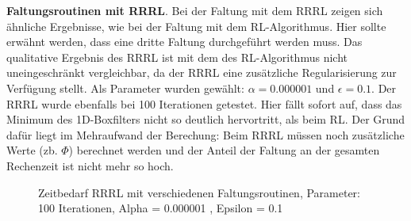 \documentclass[a4paper,12pt]{article}
\begin{document}
\textbf{Faltungsroutinen mit RRRL}.
Bei der Faltung mit dem RRRL zeigen sich ähnliche Ergebnisse, wie bei der
Faltung mit dem RL-Algorithmus. Hier sollte erwähnt werden, dass eine dritte
Faltung durchgeführt werden muss. Das qualitative Ergebnis des RRRL ist 
mit dem des RL-Algorithmus nicht uneingeschränkt vergleichbar, da der RRRL
eine zusätzliche Regularisierung zur Verfügung stellt. 
Als Parameter wurden gewählt: $\alpha = 0.000001$ und $\epsilon =
0.1$. Der RRRL wurde ebenfalls bei 100
Iterationen getestet.
Hier fällt sofort auf, dass das Minimum des 1D-Boxfilters nicht so deutlich hervortritt, als beim
RL. Der Grund dafür liegt im Mehraufwand der Berechung: Beim RRRL müssen noch
zusätzliche Werte (zb. $\Phi$) berechnet werden und der Anteil der Faltung an
der gesamten Rechenzeit ist nicht mehr so hoch.


\begin{figure}[htbp]
\caption{Zeitbedarf RRRL mit verschiedenen Faltungsroutinen, Parameter: 100
Iterationen, Alpha = 0.000001 , Epsilon = 0.1 }%
\label{figure_zeit_rrrl}
\end{figure}
\end{document}
